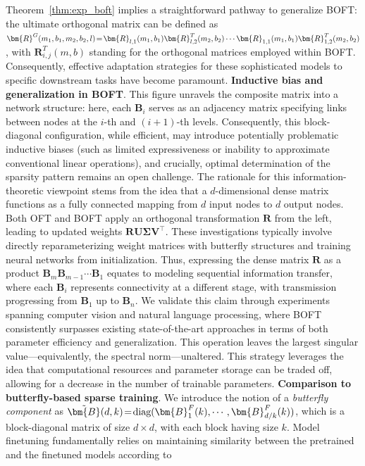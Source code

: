 \begin{itemize}[leftmargin=*,nosep]

Theorem~\ref{thm:exp_boft} implies a straightforward pathway to generalize BOFT: the ultimate orthogonal matrix can be defined as $\thickmuskip=2mu \medmuskip=2mu \bm{R}^G(m_1,b_1,m_2,b_2,l)=\bm{R}_{l,1}(m_1,b_1)\bm{R}_{l,2}^T(m_2,b_2)\cdots\bm{R}_{1,1}(m_1,b_1)\bm{R}_{1,2}^T(m_2,b_2)$, with $\bm{R}_{i,j}^T(m,b)$ standing for the orthogonal matrices employed within BOFT. Consequently, effective adaptation strategies for these sophisticated models to specific downstream tasks have become paramount. \textbf{Inductive bias and generalization in BOFT}. This figure unravels the composite matrix into a network structure: here, each $\bm{B}_i$ serves as an adjacency matrix specifying links between nodes at the $i$-th and $(i+1)$-th levels. Consequently, this block-diagonal configuration, while efficient, may introduce potentially problematic inductive biases (such as limited expressiveness or inability to approximate conventional linear operations), and crucially, optimal determination of the sparsity pattern remains an open challenge. The rationale for this information-theoretic viewpoint stems from the idea that a $d$-dimensional dense matrix functions as a fully connected mapping from $d$ input nodes to $d$ output nodes. Both OFT and BOFT apply an orthogonal transformation $\bm{R}$ from the left, leading to updated weights $\bm{R}\bm{U}\bm{\Sigma}\bm{V}^\top$. These investigations typically involve directly reparameterizing weight matrices with butterfly structures and training neural networks from initialization. Thus, expressing the dense matrix $\bm{R}$ as a product $\bm{B}_m\bm{B}_{m-1}\cdots\bm{B}_1$ equates to modeling sequential information transfer, where each $\bm{B}_i$ represents connectivity at a different stage, with transmission progressing from $\bm{B}_1$ up to $\bm{B}_n$. We validate this claim through experiments spanning computer vision and natural language processing, where BOFT consistently surpasses existing state-of-the-art approaches in terms of both parameter efficiency and generalization. This operation leaves the largest singular value—equivalently, the spectral norm—unaltered. This strategy leverages the idea that computational resources and parameter storage can be traded off, allowing for a decrease in the number of trainable parameters. \textbf{Comparison to butterfly-based sparse training}. We introduce the notion of a \emph{butterfly component} as $\thickmuskip=2mu \medmuskip=2mu \tilde{\bm{B}}(d,k)=\text{diag}(\bm{B}^F_1(k),\cdots,\bm{B}^F_{d/k}(k))$, which is a block-diagonal matrix of size $d\times d$, with each block having size $k$. Model finetuning fundamentally relies on maintaining similarity between the pretrained and the finetuned models according to 
\end{itemize}

